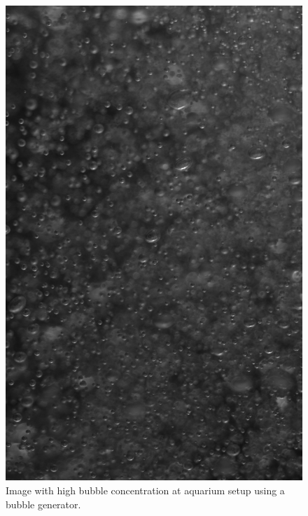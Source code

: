 \begin{figure}
	\centering
	\includegraphics[scale=0.3]{images/aquarium_result_high_conc.jpg}
	\caption{Image with high bubble concentration at aquarium setup using a bubble generator.}
\end{figure}